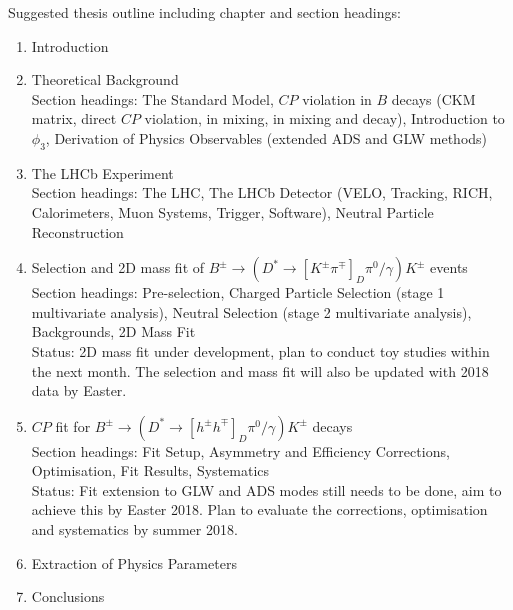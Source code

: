 \documentclass[oneside,12pt]{article}
\begin{document}
\noindent Suggested thesis outline including chapter and section headings:
\begin{enumerate}
\item Introduction
\item Theoretical Background \\
			Section headings: The Standard Model, $CP$ violation in $B$ decays (CKM
matrix, direct $CP$ violation, in mixing, in mixing and decay), Introduction to
$\phi_3$, Derivation of Physics Observables (extended ADS and GLW methods)
\item The LHCb Experiment \\
			Section headings: The LHC, The LHCb Detector (VELO, Tracking, RICH,
Calorimeters, Muon Systems, Trigger, Software), Neutral Particle Reconstruction 
\item Selection and 2D mass fit of $B^{\pm}\rightarrow (D^*\rightarrow [K^{\pm}\pi^{\mp}]_D\pi^0/\gamma)K^{\pm}$ events \\
			Section headings: Pre-selection, Charged Particle Selection (stage 1
multivariate analysis), Neutral Selection (stage 2 multivariate analysis),
Backgrounds, 2D Mass Fit \\
			Status: 2D mass fit under development, plan to
conduct toy studies within the next month. The selection and mass fit will also
be updated with 2018 data by Easter. 
\item $CP$ fit for $B^{\pm}\rightarrow (D^*\rightarrow [h^{\pm}h^{\mp}]_D\pi^0/\gamma)K^{\pm}$ decays \\
			Section headings: Fit Setup, Asymmetry and Efficiency Corrections,
Optimisation, Fit Results, Systematics \\
		Status: Fit extension to GLW and ADS modes still needs to be done, aim to achieve this by Easter 2018. Plan to evaluate the corrections, optimisation and systematics by summer 2018.
\item Extraction of Physics Parameters
\item Conclusions
\end{enumerate}

\printbibliography[heading=bibintoc,{title=References}]
\end{document}
